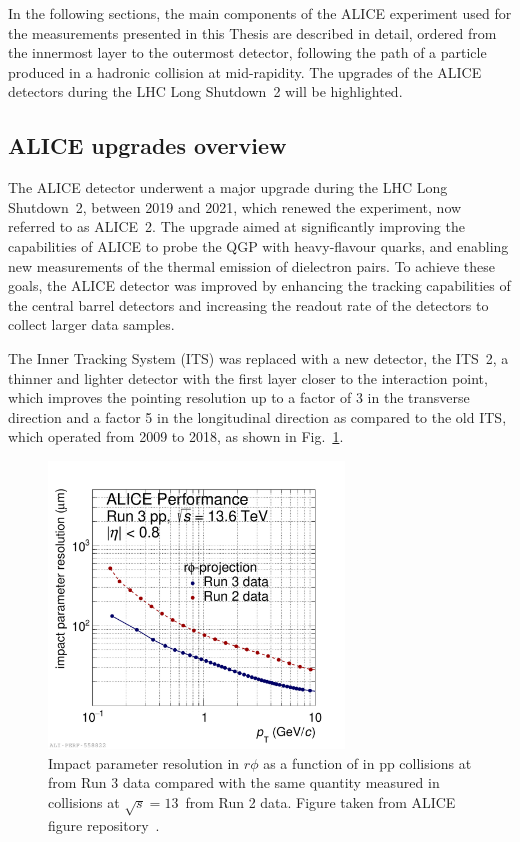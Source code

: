 In the following sections, the main components of the ALICE experiment used for the measurements presented in this Thesis are described in detail, ordered from the innermost layer to the outermost detector, following the path of a particle produced in a hadronic collision at mid-rapidity. The upgrades of the ALICE detectors during the LHC Long Shutdown~2 will be highlighted.

\subsection{ALICE upgrades overview}
The ALICE detector underwent a major upgrade during the LHC Long Shutdown~2, between 2019 and 2021, which renewed the experiment, now referred to as ALICE~2. The upgrade aimed at significantly improving the capabilities of ALICE to probe the QGP with heavy-flavour quarks, and enabling new measurements of the thermal emission of dielectron pairs. To achieve these goals, the ALICE detector was improved by enhancing the tracking capabilities of the central barrel detectors and increasing the readout rate of the detectors to collect larger data samples. 

The Inner Tracking System (ITS) was replaced with a new detector, the ITS~2, a thinner and lighter detector with the first layer closer to the interaction point, which improves the pointing resolution up to a factor of 3 in the transverse direction and a factor 5 in the longitudinal direction as compared to the old ITS, which operated from 2009 to 2018, as shown in Fig.~\ref{fig:ITS_res}.

\begin{figure}[htb]
    \centering
    \includegraphics[width=0.7\textwidth]{Figures/Chapter 3/sigmadcaxy_run2vsrun3data_qm.pdf}
    \caption{Impact parameter resolution in $r\phi$ as a function of \pt in pp collisions at \thirteen from Run 3 data compared with the same quantity measured in collisions at $\sqrt{s} = 13$~\tev from Run 2 data. Figure taken from ALICE figure repository~\cite{ALICE_figures}.}
    \label{fig:ITS_res}
\end{figure}

